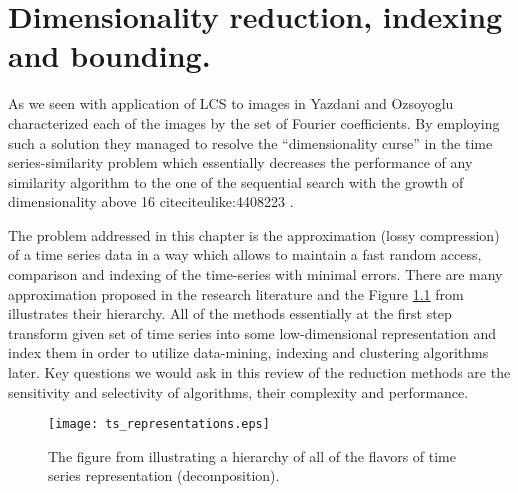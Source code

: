 \chapter{Dimensionality reduction, indexing and bounding.}
As we seen with application of LCS to images in \cite{citeulike:4367061} Yazdani and Ozsoyoglu characterized each of the images by the set of Fourier coefficients. By employing such a solution they managed to resolve the ``dimensionality curse'' in the time series-similarity problem which essentially decreases the performance of any similarity algorithm to the one of the sequential search with the growth of dimensionality above 16 cite{citeulike:4408223} \cite{citeulike:4384496} \cite{citeulike:2843857} \cite{citeulike:4384489} \cite{citeulike:343069}.

The problem addressed in this chapter is the approximation (lossy compression) of a time series data in a way which allows to maintain a fast random access, comparison and indexing of the time-series with minimal errors. There are many approximation proposed in the research literature and the Figure \ref{fig:approximations} from \cite{citeulike:2821475} illustrates their hierarchy. All of the methods essentially at the first step transform given set of time series into some low-dimensional representation and index them in order to utilize data-mining, indexing and clustering algorithms later. Key questions we would ask in this review of the reduction methods are the sensitivity and selectivity of algorithms, their complexity and performance.

\begin{figure}[tbp]
   \centering
   \texttt{[image: ts\_representations.eps]}
   \caption{The figure from \cite{citeulike:2821475} illustrating a hierarchy of all of the flavors of time series representation (decomposition).}
   \label{fig:approximations}
\end{figure} 
